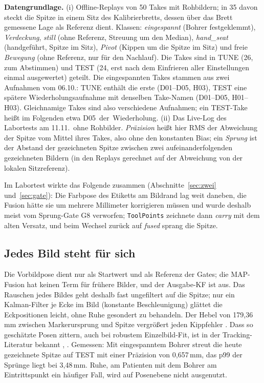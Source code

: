 \documentclass[11pt,a4paper,fleqn]{article}
\newcommand{\code}[1]{\texttt{#1}}
\begin{document}
\textbf{Datengrundlage.} (i) Offline-Replays von 50 Takes mit Rohbildern; in 35 davon steckt die Spitze in einem
Sitz des Kalibrierbretts, dessen über das Brett gemessene Lage als Referenz dient. Klassen: \emph{eingespannt}
(Bohrer festgeklemmt), \emph{Verdeckung}, \emph{still} (ohne Referenz, Streuung um den Median),
\emph{hand\_seat} (handgeführt, Spitze im Sitz), \emph{Pivot} (Kippen um die Spitze im Sitz) und freie
\emph{Bewegung} (ohne Referenz, nur für den Nachlauf). Die Takes sind in TUNE (26, zum Abstimmen) und TEST (24,
erst nach dem Einfrieren aller Einstellungen einmal ausgewertet) geteilt. Die eingespannten Takes stammen aus zwei
Aufnahmen vom 06.10.: TUNE enthält die erste (D01--D05, H03), TEST eine spätere Wiederholungsaufnahme mit
denselben Take-Namen (D01--D05, H01--H03). Gleichnamige Takes sind also verschiedene Aufnahmen; ein TEST-Take
heißt im Folgenden etwa \glqq D05~der~Wiederholung\grqq. (ii) Das Live-Log des Labortests am
11.11.\ ohne Rohbilder. \emph{Präzision} heißt hier RMS der Abweichung der Spitze vom Mittel ihres Takes, also
ohne den konstanten Bias; ein \emph{Sprung} ist der Abstand der gezeichneten Spitze zwischen zwei
aufeinanderfolgenden gezeichneten Bildern (in den Replays gerechnet auf der Abweichung von der lokalen
Sitzreferenz).

Im Labortest wirkte das Folgende zusammen (Abschnitte~\ref{sec:zwei} und~\ref{sec:gate}): Die Farbpose des Etiketts am Bildrand lag
weit daneben, die Fusion hätte sie um mehrere Millimeter korrigieren müssen und wurde deshalb meist vom
Sprung-Gate G8 verworfen; \code{ToolPoints} zeichnete dann \emph{carry} mit dem alten Versatz, und beim Wechsel
zurück auf \emph{fused} sprang die Spitze.

\subsection{Jedes Bild steht für sich}

Die Vorbildpose dient nur als Startwert und als Referenz der Gates; die MAP-Fusion hat keinen Term für frühere
Bilder, und der Ausgabe-KF ist aus. Das Rauschen jedes Bildes geht deshalb fast ungefiltert auf die Spitze; nur
ein Kalman-Filter je Ecke im Bild (konstante Beschleunigung) glättet die Eckpositionen leicht, ohne Ruhe
gesondert zu behandeln. Der Hebel von 179,36\,mm zwischen Markerursprung und Spitze vergrößert jeden Kippfehler
\cite[S.~535, 543]{west2004designing}. Dass so geschätzte Posen zittern, auch bei robustem Einzelbild-Fit, ist in
der Tracking-Literatur bekannt \cite[S.~60--61, 72]{lepetit2005monocular}, \cite[Abschn.~III.A]{vacchetti2004stable}.
Gemessen: Mit eingespanntem Bohrer streut die heute gezeichnete Spitze auf TEST mit einer Präzision von
0,657\,mm, das p99 der Sprünge liegt bei 3,48\,mm. Ruhe, am Patienten mit dem Bohrer am Eintrittspunkt ein
häufiger Fall, wird auf Posenebene nicht ausgenutzt.
\end{document}
